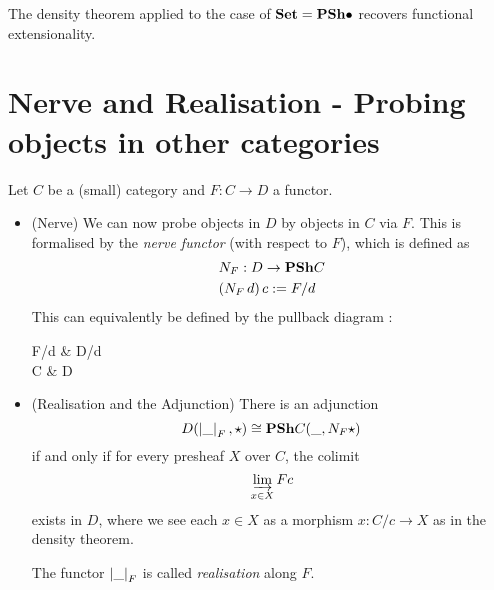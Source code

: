 \documentclass{article}
\begin{document}
\begin{eg}
  
  The density theorem applied to the case of $\mathbf{Set} = \mathbf{PSh} \bullet$
  recovers functional extensionality.
\end{eg}

\section{Nerve and Realisation - Probing objects in other categories}

\begin{prop}

  Let $C$ be a (small) category and
  $F :  C \to D$ a functor.
  \begin{itemize}
    \item (Nerve)
    We can now probe objects in $D$ by objects in $C$ via $F$.
    This is formalised by the \emph{nerve functor} (with respect to $F$),
    which is defined as 
    \begin{align*}
      &N_F : D \to \mathbf{PSh} C \\
      &( N_F \, d ) \, c := F / d
    \end{align*}
    This can equivalently be defined by the pullback diagram : 
    \begin{cd}
      {F/d} & {D/d} \\
      C & D
      \arrow[from=1-1, to=2-1]
      \arrow[from=2-1, to=2-2]
      \arrow[from=1-2, to=2-2]
      \arrow[from=1-1, to=1-2]
      \arrow["\lrcorner"{anchor=center, pos=0.125}, draw=none, from=1-1, to=2-2]
    \end{cd}
    \item (Realisation and the Adjunction)
    There is an adjunction
    \[
      D ( \left\vert \_ \right\vert_F , \star) \cong \mathbf{PSh} C ( \_ , N_F \star)
    \]
    if and only if for every presheaf $X$ over $C$,
    the colimit \[
      \varinjlim_{x \in X} F c  
    \]
    exists in $D$, where we see each $x \in X$ as a morphism $x : C / c \to X$
    as in the density theorem.

    The functor $\left\vert \_ \right\vert_F$ is called \emph{realisation} along $F$.

  \end{itemize}

 

\end{prop}
\end{document}

